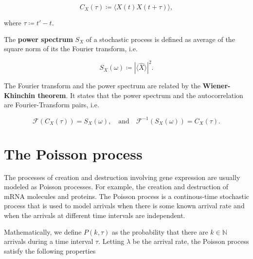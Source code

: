 \begin{equation*}
  C_X(\tau) \coloneqq \langle X(t)X(t+\tau)\rangle,
\end{equation*}

where $\tau \coloneqq t'-t$.

The \textbf{power spectrum} $S_X$ of a stochastic process is defined as average of the square norm of its the Fourier transform, i.e.

\begin{equation*}
  S_X(\omega) \coloneqq \left|\langle\hat X\rangle\right|^2.
\end{equation*}

The Fourier transform and the power spectrum are related by the \textbf{Wiener-Khinchin theorem}. It states that the power spectrum and the autocorrelation are Fourier-Transform pairs, i.e.

\begin{equation}
  \label{eq:con-wkth}
  \mathscr{F}(C_X(\tau)) = S_X(\omega),\quad\text{and}\quad \mathscr{F}^{-1}(S_X(\omega)) = C_X(\tau).
\end{equation}

\section{The Poisson process}
\label{sec:poisson}

The processes of creation and destruction involving gene expression are usually modeled as Poisson processes. For example, the creation and destruction of mRNA molecules and proteins. The Poisson process is a continous-time stochastic process that is used to model arrivals when there is some known arrival rate and when the arrivals at different time intervals are independent.

Mathematically, we define $P(k,\tau)$ as the probability that there are $k\in\mathbb{N}$ arrivals during a time interval $\tau$. Letting $\lambda$ be the arrival rate, the Poisson process satisfy the following properties

